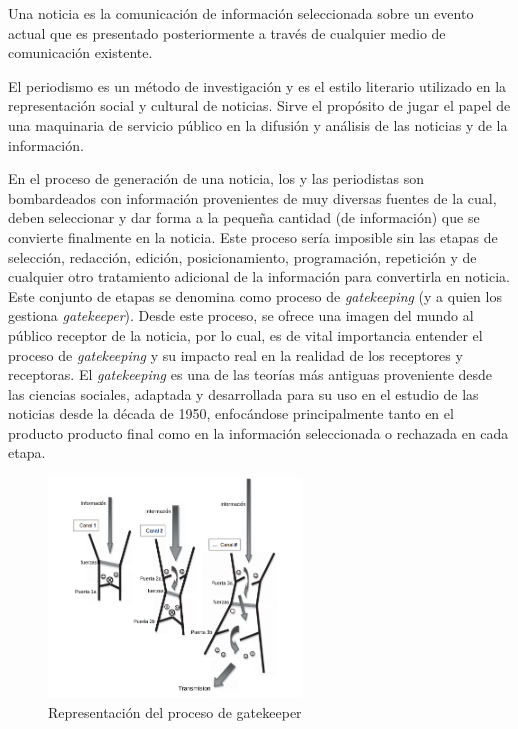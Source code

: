 \label{sec:definicion_problema}

Una noticia es la comunicación de información seleccionada sobre un evento actual que es presentado posteriormente a través de cualquier medio de comunicación existente.\cite{Shirky_2008_Herecomes}

El periodismo es un método de investigación y es el estilo literario utilizado en la representación social y cultural de noticias. Sirve el propósito de jugar el papel de una maquinaria de servicio público en la difusión y análisis de las noticias y de la información. \cite{harcup2004journalism} 

En el proceso de generación de una noticia, los y las periodistas son bombardeados con información provenientes de muy diversas fuentes de la cual, deben seleccionar y dar forma a la pequeña cantidad (de información) que se convierte finalmente en la noticia. Este proceso sería imposible sin las etapas de selección, redacción, edición, posicionamiento, programación, repetición y de cualquier otro tratamiento adicional de la información para convertirla en noticia. Este conjunto de etapas se denomina como proceso de \emph{gatekeeping} (y a quien los gestiona \emph{gatekeeper}). Desde este proceso, se ofrece una imagen del mundo al público receptor de la noticia, por lo cual, es de vital importancia  entender el proceso de \emph{gatekeeping} y su impacto real en la realidad de los receptores y receptoras. El \emph{gatekeeping} es una de las teorías más antiguas proveniente desde las ciencias sociales, adaptada y desarrollada para su uso en el estudio de las noticias desde la década de 1950, enfocándose principalmente tanto en el producto producto final como en la información seleccionada o rechazada en cada etapa.

\begin{figure}[H]
  \centering
    \includegraphics[width=0.6\textwidth]{imgs/gatekeeper.png}
  \caption{Representación del proceso de gatekeeper \cite{wahl2008handbook}}
  \label{fig:gatekeeper}
\end{figure}

